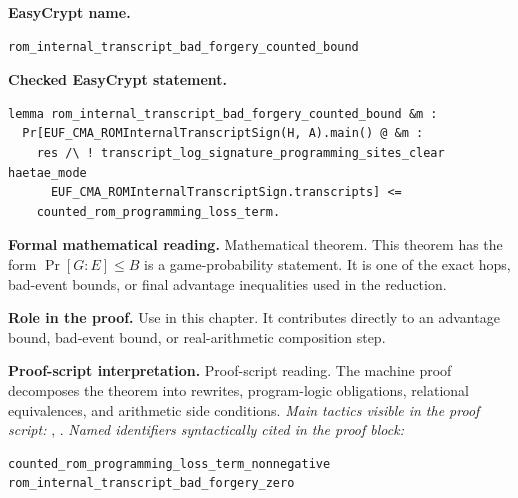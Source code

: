 \begin{formaltheorem}
\noindent\textbf{EasyCrypt name.}
\begin{lstlisting}[language=EasyCrypt,basicstyle=\ttfamily\scriptsize]
rom_internal_transcript_bad_forgery_counted_bound
\end{lstlisting}
\noindent\textbf{Checked EasyCrypt statement.}
\begin{lstlisting}[language=EasyCrypt,basicstyle=\ttfamily\scriptsize]
lemma rom_internal_transcript_bad_forgery_counted_bound &m :
  Pr[EUF_CMA_ROMInternalTranscriptSign(H, A).main() @ &m :
    res /\ ! transcript_log_signature_programming_sites_clear haetae_mode
      EUF_CMA_ROMInternalTranscriptSign.transcripts] <=
    counted_rom_programming_loss_term.
\end{lstlisting}
\noindent\textbf{Formal mathematical reading.}
Mathematical theorem. This theorem has the form \(\Pr[G:E] \le B\) is a game-probability statement.  It is one of the exact hops, bad-event bounds, or final advantage inequalities used in the reduction.

\noindent\textbf{Role in the proof.}
Use in this chapter. It contributes directly to an advantage bound, bad-event bound, or real-arithmetic composition step.

\noindent\textbf{Proof-script interpretation.}
Proof-script reading. The machine proof decomposes the theorem into rewrites, program-logic obligations, relational equivalences, and arithmetic side conditions.
\emph{Main tactics visible in the proof script:} , .
\emph{Named identifiers syntactically cited in the proof block:}
\begin{lstlisting}[language=EasyCrypt,basicstyle=\ttfamily\scriptsize]
counted_rom_programming_loss_term_nonnegative
rom_internal_transcript_bad_forgery_zero
\end{lstlisting}

\end{formaltheorem}

